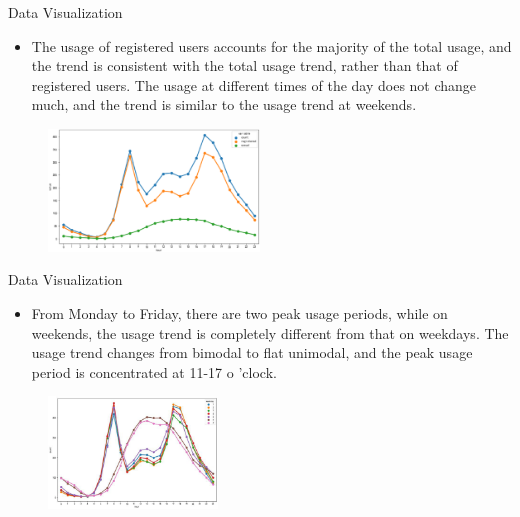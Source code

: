 \documentclass[
 size=14pt,
 paper=smartboard,  %
 mode=present, 		%
 display=slides, 	%
 style=tuliplab,  	%
 pauseslide,
 fleqn,leqno]{powerdot}
\begin{document}
\begin{slide}[toc=,bm=]{Data  Visualization}
  \begin{center}

    {
      \begin{itemize}
        
        \item The usage of registered users accounts for the majority of the total usage, and the trend is consistent with the total usage trend, rather than that of registered users. The usage at different times of the day does not change much, and the trend is similar to the usage trend at weekends.
      \end{itemize} 
      \begin{figure}
        \centering
        \includegraphics[width=0.5\textwidth]{pic/three hour3.eps}
      \end{figure}   
      
    }
    \end{center}
 


\end{slide}
\begin{slide}[toc=,bm=]{Data  Visualization}
  \begin{center}

    {
      \begin{itemize}
        
        \item From Monday to Friday, there are two peak usage periods, while on weekends, the usage trend is completely different from that on weekdays. The usage trend changes from bimodal to flat unimodal, and the peak usage period is concentrated at 11-17 o 'clock.
    \end{itemize}   
      \begin{figure}
        \centering
        \includegraphics[width=0.4\textwidth]{pic/three hour2 (1).eps}
      \end{figure} 
     
    }
    \end{center}
 


\end{slide}
\end{document}
